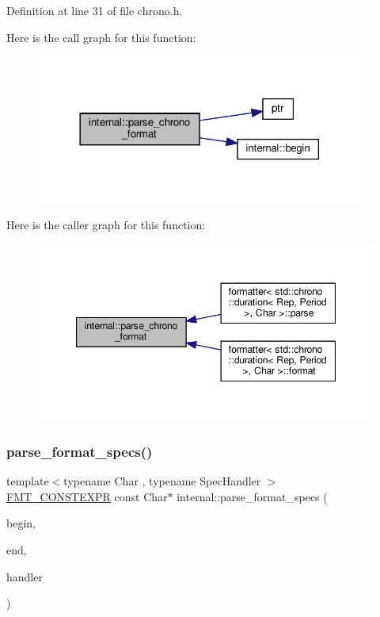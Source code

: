 Definition at line 31 of file chrono.\+h.

Here is the call graph for this function\+:
\nopagebreak
\begin{figure}[H]
\begin{center}
\leavevmode
\includegraphics[width=306pt]{namespaceinternal_adb293fc437669ac43eac0ca61734db90_cgraph}
\end{center}
\end{figure}
Here is the caller graph for this function\+:
\nopagebreak
\begin{figure}[H]
\begin{center}
\leavevmode
\includegraphics[width=347pt]{namespaceinternal_adb293fc437669ac43eac0ca61734db90_icgraph}
\end{center}
\end{figure}
\mbox{\label{namespaceinternal_af89a4b19adfe070b0cb66cf9f694caf3}} 
\subsubsection{\texorpdfstring{parse\+\_\+format\+\_\+specs()}{parse\_format\_specs()}\hspace{0.1cm}{\footnotesize\ttfamily [1/2]}}
{\footnotesize\ttfamily template$<$typename Char , typename Spec\+Handler $>$ \\
\hyperlink{core_8h_a69201cb276383873487bf68b4ef8b4cd}{F\+M\+T\+\_\+\+C\+O\+N\+S\+T\+E\+X\+PR} const Char$\ast$ internal\+::parse\+\_\+format\+\_\+specs (\begin{DoxyParamCaption}\item[{const Char $\ast$}]{begin,  }\item[{const Char $\ast$}]{end,  }\item[{Spec\+Handler \&\&}]{handler }\end{DoxyParamCaption})}



